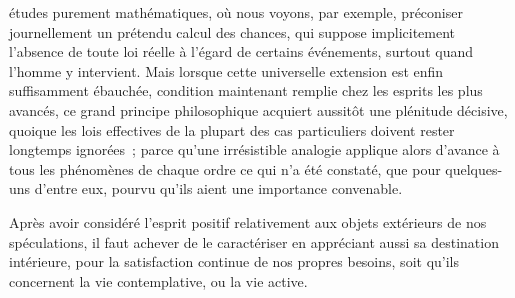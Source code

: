\documentclass[french,twoside]{book} %
\begin{document}
études purement mathématiques, où nous voyons, par exemple, préconiser journellement un prétendu calcul des chances, qui suppose implicitement l’absence de toute loi réelle à l’égard de certains événements, surtout quand l’homme y intervient. Mais lorsque cette universelle extension est enfin suffisamment ébauchée, condition maintenant remplie chez les esprits les plus avancés, ce grand principe philosophique acquiert aussitôt une plénitude décisive, quoique les lois effectives de la plupart des cas particuliers doivent rester longtemps ignorées ; parce qu’une irrésistible analogie applique alors d’avance à tous les phénomènes de chaque ordre ce qui n’a été constaté, que pour quelques-uns d’entre eux, pourvu qu’ils aient une importance convenable.\par
Après avoir considéré l’esprit positif relativement aux objets extérieurs de nos spéculations, il faut achever de le caractériser en appréciant aussi sa destination intérieure, pour la satisfaction continue de nos propres besoins, soit qu’ils concernent la vie contemplative, ou la vie active.\par
\end{document}
